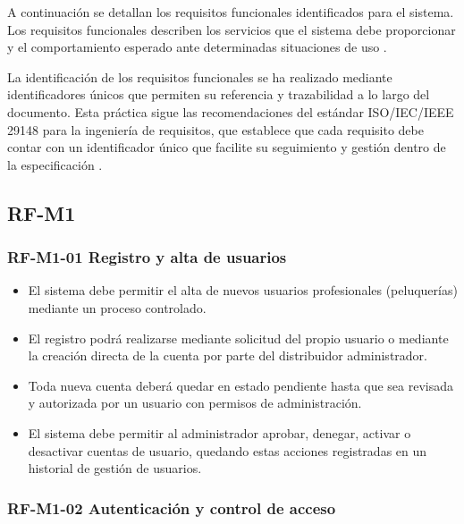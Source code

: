 A continuación se detallan los requisitos funcionales identificados para el sistema.  Los requisitos funcionales describen los servicios que el sistema debe proporcionar  y el comportamiento esperado ante determinadas situaciones de uso  \cite[Chap.~4.1.1, pp.~85--87]{sommerville}.

La identificación de los requisitos funcionales se ha realizado mediante identificadores únicos que permiten su referencia y trazabilidad a lo largo del documento. Esta práctica sigue las recomendaciones del estándar ISO/IEC/IEEE 29148 para la ingeniería de requisitos, que establece que cada requisito debe contar con un identificador único que facilite su seguimiento y gestión dentro de la especificación \cite{ieee29148}.


\subsection{RF-M1}

\vspace{-0.75em}
\subsubsection{RF-M1-01 Registro y alta de usuarios}
\vspace{-1em}

\begin{itemize}
    \item El sistema debe permitir el alta de nuevos usuarios profesionales (peluquerías) mediante un proceso controlado.
    \item El registro podrá realizarse mediante solicitud del propio usuario o mediante la creación directa de la cuenta por parte del distribuidor administrador.
    \item Toda nueva cuenta deberá quedar en estado pendiente hasta que sea revisada y autorizada por un usuario con permisos de administración.
    \item El sistema debe permitir al administrador aprobar, denegar, activar o desactivar cuentas de usuario, quedando estas acciones registradas en un historial de gestión de usuarios.
\end{itemize}

\vspace{-0.75em}
\subsubsection{RF-M1-02 Autenticación y control de acceso}
\vspace{-1em}

